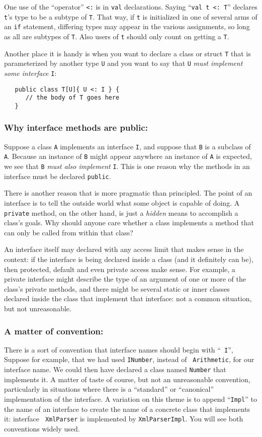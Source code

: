 One use of the ``operator'' {\tt <:} is in {\tt val} declarations. 
Saying ``{\tt val t <: T}'' declares {\tt t}'s type to be a subtype of {\tt T}. 
That way, if {\tt t} is initialized in one of several arms of an {\tt if}
statement, differing types may appear in the various assignments, so long as all
are subtypes of {\tt T}.  Also users of {\tt t} should only count on getting a
{\tt T}.

Another place it is handy is when you want to declare a class or struct {\tt T}
that is parameterized by another type {\tt U} and you want to say that 
{\tt U} {\em must implement some interface} {\tt I}:
\begin{verbatim}
   public class T[U]{ U <: I } { 
      // the body of T goes here
   }
\end{verbatim}

\subsubsection{ Why interface methods are public:}  Suppose a class {\tt A} implements an
interface {\tt I}, and suppose that {\tt B} is a subclass of {\tt A}.  Because
an instance of {\tt B} might appear anywhere an instance of {\tt A} is 
expected, we see that {\tt B} {\em must also implement} {\tt I}. This is one
reason why the methods in an interface must be declared {\tt public}.

There is another reason that is more pragmatic than principled.  The point of an
interface is to tell the outside world what some object is capable of doing.
A {\tt private} method, on the other hand, is just a {\em hidden} means to
accomplish a class's goals.  Why should anyone care whether a class implements
a method that can only be called from within that class?

An interface itself may declared with any access limit that makes sense in the
context: if the interface is being declared inside a class (and it definitely
can be), then protected, default and even private access make sense.  For
example, a private interface might describe the type of an argument of
one or more of the class's private methods, and there might be several static
or inner classes declared inside the class that implement that interface: not 
a common situation, but not unreasonable.

\subsubsection{ A matter of convention: }
There is a sort of convention that interface names should begin with ``{\tt
I}'',  Suppose for example, that we had used {\tt INumber}, instead of {\tt
Arithmetic}, for our interface name.  We could then have declared  a class
named {\tt Number} that implements it.  A matter of taste of course, but not an
unreasonable convention, particularly in situations where there is a
``standard'' or ``canonical'' implementation of the interface.  A variation on
this theme is to append ``{\tt Impl}'' to the name of an interface to create
the name of a concrete class that implements it: \eg{} interface {\tt
XmlParser} is implemented by {\tt XmlParserImpl}.  You will see both
conventions widely used.

